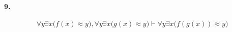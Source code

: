 \documentclass[]{exam}
\begin{document}
\paragraph[9.1]{9.}

$$\forall y \exists x \biggl( f(x) \approx y \biggr), 
\forall y \exists x \biggl( g(x) \approx y\biggr)
\vdash \forall y \exists x \biggl( f(g(x)) \approx y \biggr)
$$
\end{document}
